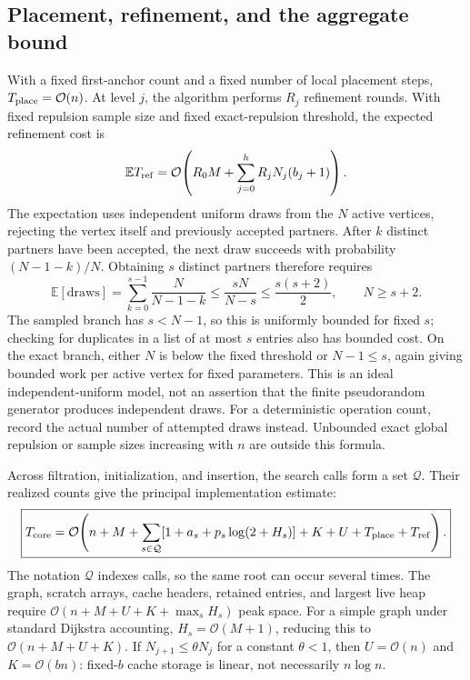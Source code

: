 \documentclass[11pt,a4paper]{article}
\newcommand{\bigO}{\mathcal O}
\begin{document}
\subsection{Placement, refinement, and the aggregate bound}

With a fixed first-anchor count and a fixed number of local placement steps,
$T_{\rm place}=\bigO(n)$. At level $j$, the algorithm performs $R_j$ refinement
rounds. With fixed repulsion sample size and fixed exact-repulsion threshold,
the expected refinement cost is
\begin{equation}
 \mathbb E T_{\rm ref}=\bigO\!\left(
   R_0M+\sum_{j=0}^{h}R_jN_j(b_j+1)\right).
 \label{eq:refine}
\end{equation}
The expectation uses independent uniform draws from the $N$ active vertices,
rejecting the vertex itself and previously accepted partners. After $k$
distinct partners have been accepted, the next draw succeeds with probability
$(N-1-k)/N$. Obtaining $s$ distinct partners therefore requires
\begin{equation}
 \mathbb E[\text{draws}]
 =\sum_{k=0}^{s-1}\frac{N}{N-1-k}
 \leq\frac{sN}{N-s}
 \leq\frac{s(s+2)}{2},\qquad N\geq s+2.
 \label{eq:repulsion-draws}
\end{equation}
The sampled branch has $s<N-1$, so this is uniformly bounded for fixed $s$;
checking for duplicates in a list of at most $s$ entries also has bounded cost.
On the exact branch, either $N$ is below the fixed threshold or $N-1\leq s$,
again giving bounded work per active vertex for fixed parameters. This is an
ideal independent-uniform model, not an assertion that the finite pseudorandom
generator produces independent draws. For a deterministic operation count,
record the actual number of attempted draws instead. Unbounded exact global
repulsion or sample sizes increasing with $n$ are outside this formula.

Across filtration, initialization, and insertion, the search calls form a set
$\mathcal Q$. Their realized counts give the principal implementation estimate:
\begin{equation}
 \boxed{T_{\rm core}=\bigO\!\left(
 n+M+\sum_{s\in\mathcal Q}
 [1+a_s+p_s\log(2+H_s)]+K+U+T_{\rm place}+T_{\rm ref}\right).}
 \label{eq:total}
\end{equation}
The notation $\mathcal Q$ indexes calls, so the same root can occur several
times. The graph, scratch arrays, cache headers, retained entries, and largest
live heap require $\bigO(n+M+U+K+\max_s H_s)$ peak space. For a simple graph
under standard Dijkstra accounting, $H_s=\bigO(M+1)$, reducing this to
$\bigO(n+M+U+K)$. If $N_{j+1}\leq\theta N_j$ for a constant $\theta<1$, then
$U=\bigO(n)$ and $K=\bigO(bn)$: fixed-$b$ cache storage is linear, not
necessarily $n\log n$.
\end{document}
